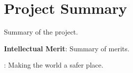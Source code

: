 \documentclass[11pt]{NSF}
\begin{document}
\section{Project Summary}

\noindent
Summary of the project.

\noindent
{\bf Intellectual Merit}: 
Summary of merits.

: 
Making the world a safer place.
\end{document}
